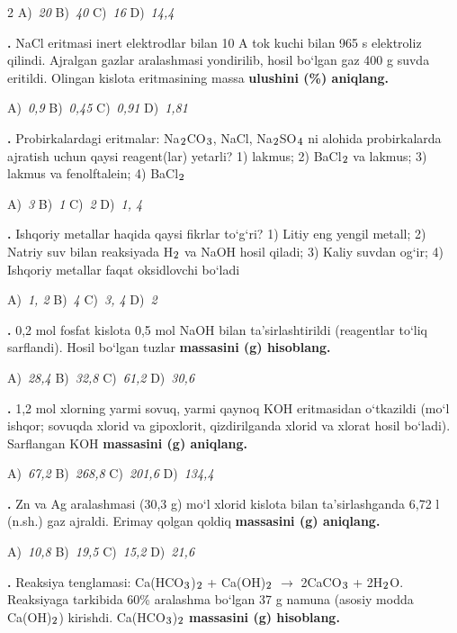 \documentclass[11pt,a4paper]{article}
\renewcommand{\textsubscript}[1]{\ensuremath{_{\text{\fontsize{8}{8}\selectfont #1}}}}
\newcommand{\qn}[1]{\textbf{\fontsize{11.5}{13}\selectfont #1}}
\newcommand{\qsep}{\par\vspace{13pt}}
\begin{document}
\begin{multicols}{2}
\noindent A)~\textsl{20} \hfill B)~\textsl{40} \hfill C)~\textsl{16} \hfill D)~\textsl{14,4}\par
\qsep
\noindent\qn{13.} NaCl eritmasi inert elektrodlar bilan 10 A tok kuchi bilan 965 s elektroliz qilindi. Ajralgan gazlar aralashmasi yondirilib, hosil bo`lgan gaz 400 g suvda eritildi. Olingan kislota eritmasining massa \textbf{ulushini (\%) aniqlang.}

\noindent A)~\textsl{0,9} \hfill B)~\textsl{0,45} \hfill C)~\textsl{0,91} \hfill D)~\textsl{1,81}\par
\qsep
\noindent\qn{14.} Probirkalardagi eritmalar: Na\textsubscript{2}CO\textsubscript{3}, NaCl, Na\textsubscript{2}SO\textsubscript{4} ni alohida probirkalarda ajratish uchun qaysi reagent(lar) yetarli? 1) lakmus; 2) BaCl\textsubscript{2} va lakmus; 3) lakmus va fenolftalein; 4) BaCl\textsubscript{2}

\noindent A)~\textsl{3} \hfill B)~\textsl{1} \hfill C)~\textsl{2} \hfill D)~\textsl{1, 4}\par
\qsep
\noindent\qn{15.} Ishqoriy metallar haqida qaysi fikrlar to`g`ri? 1) Litiy eng yengil metall; 2) Natriy suv bilan reaksiyada H\textsubscript{2} va NaOH hosil qiladi; 3) Kaliy suvdan og`ir; 4) Ishqoriy metallar faqat oksidlovchi bo`ladi

\noindent A)~\textsl{1, 2} \hfill B)~\textsl{4} \hfill C)~\textsl{3, 4} \hfill D)~\textsl{2}\par
\qsep
\noindent\qn{16.} 0,2 mol fosfat kislota 0,5 mol NaOH bilan ta'sirlashtirildi (reagentlar to`liq sarflandi). Hosil bo`lgan tuzlar \textbf{massasini (g) hisoblang.}

\noindent A)~\textsl{28,4} \hfill B)~\textsl{32,8} \hfill C)~\textsl{61,2} \hfill D)~\textsl{30,6}\par
\qsep
\noindent\qn{17.} 1,2 mol xlorning yarmi sovuq, yarmi qaynoq KOH eritmasidan o`tkazildi (mo`l ishqor; sovuqda xlorid va gipoxlorit, qizdirilganda xlorid va xlorat hosil bo`ladi). Sarflangan KOH \textbf{massasini (g) aniqlang.}

\noindent A)~\textsl{67,2} \hfill B)~\textsl{268,8} \hfill C)~\textsl{201,6} \hfill D)~\textsl{134,4}\par
\qsep
\noindent\qn{18.} Zn va Ag aralashmasi (30,3 g) mo`l xlorid kislota bilan ta'sirlashganda 6,72 l (n.sh.) gaz ajraldi. Erimay qolgan qoldiq \textbf{massasini (g) aniqlang.}

\noindent A)~\textsl{10,8} \hfill B)~\textsl{19,5} \hfill C)~\textsl{15,2} \hfill D)~\textsl{21,6}\par
\qsep
\noindent\qn{19.} Reaksiya tenglamasi: Ca(HCO\textsubscript{3})\textsubscript{2} + Ca(OH)\textsubscript{2} $\to$ 2CaCO\textsubscript{3} + 2H\textsubscript{2}O. Reaksiyaga tarkibida 60\% aralashma bo`lgan 37 g namuna (asosiy modda Ca(OH)\textsubscript{2}) kirishdi. Ca(HCO\textsubscript{3})\textsubscript{2} \textbf{massasini (g) hisoblang.}


\end{multicols}
\end{document}
